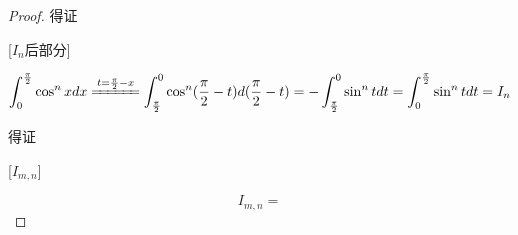 \begin{proof}
    得证

    [$I_n$后部分]

    \begin{equation*}
        \int_{0}^{\frac{\pi}{2}} \cos^n xdx
        \xlongequal{t=\frac{\pi}{2}-x}
        \int_{\frac{\pi}{2}}^{0}\cos^n (\frac{\pi}{2}-t)d(\frac{\pi}{2}-t) = - \int_{\frac{\pi}{2}}^{0}\sin^n tdt
        = \int_{0}^{\frac{\pi}{2}} \sin^n tdt =I_n 
    \end{equation*}

    得证

    [$I_{m,n}$]

    \begin{equation*}
        I_{m,n} = 
    \end{equation*}
\end{proof}






